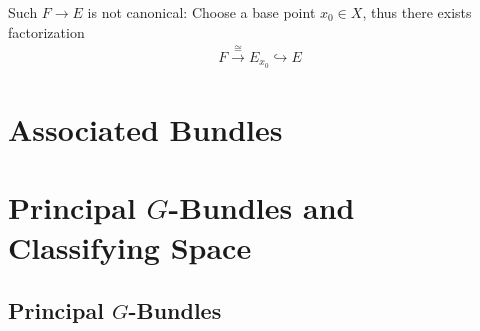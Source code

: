 \documentclass[Total.tex]{subfiles}
\begin{document}
			Such $F\rightarrow E$ is not canonical: Choose a base point $x_0\in X$, thus there exists factorization
			\begin{gather*}
				F\stackrel{\cong}{\rightarrow} E_{x_0}\hookrightarrow E
			\end{gather*}
			
	\chapter{Associated Bundles}
	
	\chapter{Principal $G$-Bundles and Classifying Space}
		\section{Principal $G$-Bundles}
\end{document}
